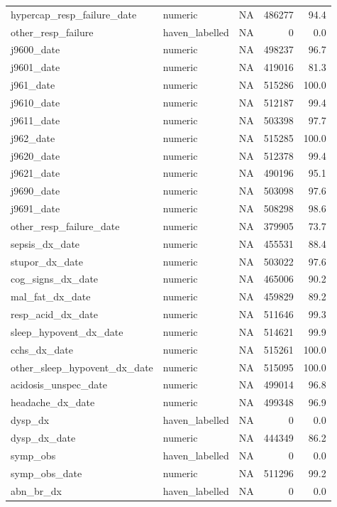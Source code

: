 \documentclass[
  11pt,
  letterpaper,
  DIV=11,
  numbers=noendperiod]{scrartcl}
\begin{document}
\begin{longtable*}{llrrr}
hypercap\_resp\_failure\_date & numeric & NA & 486277 & 94.4\\
other\_resp\_failure & haven\_labelled & NA & 0 & 0.0\\
\addlinespace
j9600\_date & numeric & NA & 498237 & 96.7\\
j9601\_date & numeric & NA & 419016 & 81.3\\
j961\_date & numeric & NA & 515286 & 100.0\\
j9610\_date & numeric & NA & 512187 & 99.4\\
j9611\_date & numeric & NA & 503398 & 97.7\\
\addlinespace
j962\_date & numeric & NA & 515285 & 100.0\\
j9620\_date & numeric & NA & 512378 & 99.4\\
j9621\_date & numeric & NA & 490196 & 95.1\\
j9690\_date & numeric & NA & 503098 & 97.6\\
j9691\_date & numeric & NA & 508298 & 98.6\\
\addlinespace
other\_resp\_failure\_date & numeric & NA & 379905 & 73.7\\
sepsis\_dx\_date & numeric & NA & 455531 & 88.4\\
stupor\_dx\_date & numeric & NA & 503022 & 97.6\\
cog\_signs\_dx\_date & numeric & NA & 465006 & 90.2\\
mal\_fat\_dx\_date & numeric & NA & 459829 & 89.2\\
\addlinespace
resp\_acid\_dx\_date & numeric & NA & 511646 & 99.3\\
sleep\_hypovent\_dx\_date & numeric & NA & 514621 & 99.9\\
cchs\_dx\_date & numeric & NA & 515261 & 100.0\\
other\_sleep\_hypovent\_dx\_date & numeric & NA & 515095 & 100.0\\
acidosis\_unspec\_date & numeric & NA & 499014 & 96.8\\
\addlinespace
headache\_dx\_date & numeric & NA & 499348 & 96.9\\
dysp\_dx & haven\_labelled & NA & 0 & 0.0\\
dysp\_dx\_date & numeric & NA & 444349 & 86.2\\
symp\_obs & haven\_labelled & NA & 0 & 0.0\\
symp\_obs\_date & numeric & NA & 511296 & 99.2\\
\addlinespace
abn\_br\_dx & haven\_labelled & NA & 0 & 0.0\\

\end{longtable*}
\end{document}
